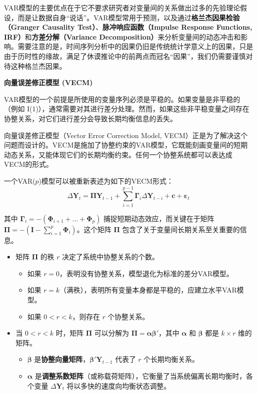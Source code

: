 VAR模型的主要优点在于它不要求研究者对变量间的关系做出过多的先验理论假设，而是让数据自身“说话”。VAR模型常用于预测，以及通过\textbf{格兰杰因果检验（Granger Causality Test）}、\textbf{脉冲响应函数（Impulse Response Functions, IRF）}和\textbf{方差分解（Variance Decomposition）}来分析变量间的动态冲击和影响。需要注意的是，时间序列分析中的因果仍旧是传统统计学意义上的因果，只是由于历时性的缘故，满足了休谟推论中的前两点而冠名“因果”，我们仍需要谨慎对待这种格兰杰因果。

\textbf{向量误差修正模型 (VECM)}

VAR模型的一个前提是所使用的变量序列必须是平稳的。如果变量是非平稳的（例如 I(1)），通常需要对其进行差分处理。然而，如果这些非平稳变量之间存在协整关系，对它们进行差分会导致长期均衡信息的丢失。

向量误差修正模型（Vector Error Correction Model, VECM）正是为了解决这个问题而设计的。VECM是施加了协整约束的VAR模型，它既能刻画变量间的短期动态关系，又能体现它们的长期均衡约束。任何一个协整系统都可以表达成VECM的形式。

一个VAR($p$)模型可以被重新表述为如下的VECM形式：
\begin{equation}
\Delta \mathbf{Y}_t = \mathbf{\Pi} \mathbf{Y}_{t-1} + \sum_{i=1}^{p-1} \mathbf{\Gamma}_i \Delta \mathbf{Y}_{t-i} + \mathbf{c} + \boldsymbol{\varepsilon}_t
\end{equation}

其中 $\mathbf{\Gamma}_i = -(\mathbf{\Phi}_{i+1} + \dots + \mathbf{\Phi}_p)$ 捕捉短期动态效应，而关键在于矩阵 $\mathbf{\Pi} = -(\mathbf{I} - \sum_{i=1}^p \mathbf{\Phi}_i)$。这个矩阵 $\mathbf{\Pi}$ 包含了关于变量间长期关系至关重要的信息。
\begin{itemize}
    \item 矩阵 $\mathbf{\Pi}$ 的秩 $r$ 决定了系统中协整关系的个数。
    \begin{itemize}
        \item 如果 $r=0$，表明没有协整关系，模型退化为标准的差分VAR模型。
        \item 如果 $r=k$（满秩），表明所有变量本身都是平稳的，应建立水平VAR模型。
        \item 如果 $0 < r < k$，则存在 $r$ 个协整关系。
    \end{itemize}
    \item 当 $0 < r < k$ 时，矩阵 $\mathbf{\Pi}$ 可以分解为 $\mathbf{\Pi} = \boldsymbol{\alpha}\boldsymbol{\beta}'$，其中 $\boldsymbol{\alpha}$ 和 $\boldsymbol{\beta}$ 都是 $k \times r$ 维的矩阵。
    \begin{itemize}
        \item $\boldsymbol{\beta}$ 是\textbf{协整向量矩阵}，$\boldsymbol{\beta}' \mathbf{Y}_{t-1}$ 代表了 $r$ 个长期均衡关系。
        \item $\boldsymbol{\alpha}$ 是\textbf{调整系数矩阵}（或称载荷矩阵），它衡量了当系统偏离长期均衡时，各个变量 $\Delta \mathbf{Y}_t$ 将以多快的速度向均衡状态调整。
    \end{itemize}
\end{itemize}

